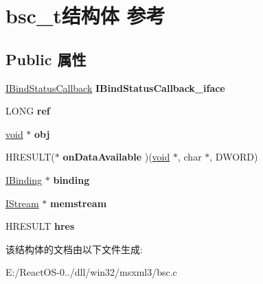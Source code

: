 \hypertarget{structbsc__t}{}\section{bsc\+\_\+t结构体 参考}
\label{structbsc__t}
\subsection*{Public 属性}
\begin{DoxyCompactItemize}
\item 
\mbox{\label{structbsc__t_ac4b6c6e6da66aa37acc4b546a9906fc4}} 
\hyperlink{interface_i_bind_status_callback}{I\+Bind\+Status\+Callback} {\bfseries I\+Bind\+Status\+Callback\+\_\+iface}
\item 
\mbox{\label{structbsc__t_a9f23d9a6b26b15860a59fb4ed9bcf8a2}} 
L\+O\+NG {\bfseries ref}
\item 
\mbox{\label{structbsc__t_abd994064ba2960ecf3940bf589a43b7f}} 
\hyperlink{interfacevoid}{void} $\ast$ {\bfseries obj}
\item 
\mbox{\label{structbsc__t_a764c1fe86c038e9c404125c52812ed2c}} 
H\+R\+E\+S\+U\+LT($\ast$ {\bfseries on\+Data\+Available} )(\hyperlink{interfacevoid}{void} $\ast$, char $\ast$, D\+W\+O\+RD)
\item 
\mbox{\label{structbsc__t_a9b7ffb0cbe7c1331edc03b91809d5636}} 
\hyperlink{interface_i_binding}{I\+Binding} $\ast$ {\bfseries binding}
\item 
\mbox{\label{structbsc__t_a9f621160f2aefc45cf5007e4c42580b8}} 
\hyperlink{interface_i_stream}{I\+Stream} $\ast$ {\bfseries memstream}
\item 
\mbox{\label{structbsc__t_ab600046d013faad6bfb28f1662666953}} 
H\+R\+E\+S\+U\+LT {\bfseries hres}
\end{DoxyCompactItemize}


该结构体的文档由以下文件生成\+:\begin{DoxyCompactItemize}
\item 
E\+:/\+React\+O\+S-\/0../dll/win32/msxml3/bsc.\+c\end{DoxyCompactItemize}
